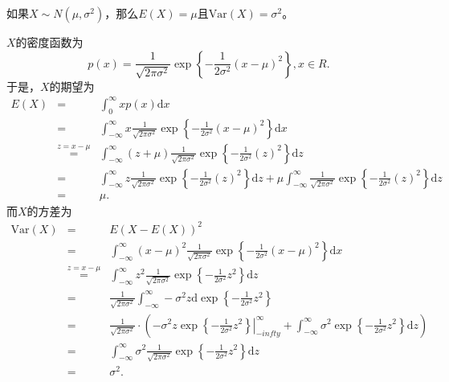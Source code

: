 \begin{example}
    如果$X\sim N(\mu,\sigma^2)$，那么$E(X) = \mu$且$\text{Var}(X) = \sigma^2$。
\end{example}
\begin{solution}
$X$的密度函数为
    $$
    p(x) = \frac{1}{\sqrt{2\pi \sigma^2}} \exp\left\{ - \frac{1}{2\sigma^2} (x-\mu)^2\right\},x\in R.
    $$
于是，$X$的期望为
\begin{eqnarray*}
    E(X) &=&  \int_{0}^{\infty} x p(x) \text{d}x\\
 &=&     \int_{-\infty}^{\infty} x \frac{1}{\sqrt{2\pi \sigma^2}} \exp\left\{ - \frac{1}{2\sigma^2} (x-\mu)^2\right\} \text{d}x\\
    &\overset{z = x-\mu}{=}&  \int_{-\infty}^{\infty} (z+\mu) \frac{1}{\sqrt{2\pi \sigma^2}} \exp\left\{ - \frac{1}{2\sigma^2} (z)^2\right\} \text{d} z\\
    &= & \int_{-\infty}^{\infty} z \frac{1}{\sqrt{2\pi \sigma^2}} \exp\left\{ - \frac{1}{2\sigma^2} (z)^2\right\} \text{d} z + \mu\int_{-\infty}^{\infty}  \frac{1}{\sqrt{2\pi \sigma^2}} \exp\left\{ - \frac{1}{2\sigma^2} (z)^2\right\} \text{d} z\\
    &=& \mu.
\end{eqnarray*}
而$X$的方差为
\begin{eqnarray*}
    \text{Var}(X) &=& E(X-E(X))^2\\
    &=&\int_{-\infty}^{\infty} (x-\mu)^2 \frac{1}{\sqrt{2\pi \sigma^2}} \exp\left\{ - \frac{1}{2\sigma^2} (x-\mu)^2\right\} \text{d} x \\
    &\overset{z = x-\mu}{=}& \int_{-\infty}^{\infty} z^2 \frac{1}{\sqrt{2\pi \sigma^2}} \exp\left\{ - \frac{1}{2\sigma^2} z^2\right\} \text{d} z\\
&=&  \frac{1}{\sqrt{2\pi \sigma^2}} \int_{-\infty}^{\infty} -{\sigma^2} z \text{d} \exp\left\{ - \frac{1}{2\sigma^2} z^2\right\} \\
&=& \frac{1}{\sqrt{2\pi \sigma^2}} \cdot \left(\left.-{\sigma^2} z\exp\left\{ - \frac{1}{2\sigma^2} z^2\right\} \right|_{-infty}^{\infty}+  \int_{-\infty}^{\infty}  {\sigma^2}\exp\left\{ - \frac{1}{2\sigma^2} z^2\right\} \text{d}z \right)\\
&=&  \int_{-\infty}^{\infty} {\sigma^2} \frac{1}{\sqrt{2\pi \sigma^2}} \exp\left\{ - \frac{1}{2\sigma^2} z^2\right\} \text{d}z \\
&=& \sigma^2.
\end{eqnarray*}
\end{solution}

